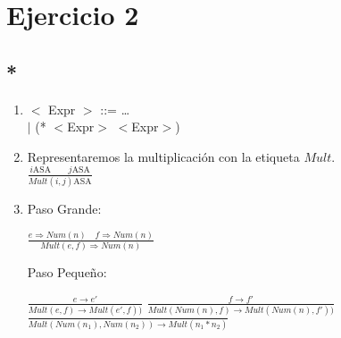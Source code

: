 \documentclass{article}
\begin{document}
\section*{Ejercicio 2}

\subsection*{*}
\begin{enumerate}[label = (\alph*)]
    \item $<$ Expr $>$ ::= \ldots \\
          $|$  (* $<$Expr$>$ $<$Expr$>$)

    \item Representaremos la multiplicación con la etiqueta $Mult$.\\
    $\frac{i\text{ASA}\qquad j\text{ASA}}{Mult(i,j)\text{ASA}}$
    
    \item Paso Grande: \begin{center}
        $\frac{e\Rightarrow Num(n)\quad f\Rightarrow Num(n)}{Mult(e,f)\Rightarrow Num(n)}$
    \end{center}

    Paso Pequeño: \begin{center}
        $\frac{e\rightarrow e'}{Mult(e,f)\rightarrow Mult(e',f))}$
        $\frac{f\rightarrow f'}{Mult(Num(n),f)\rightarrow Mult(Num(n),f'))}$
        $\frac{}{Mult(Num(n_1),Num(n_2))\rightarrow Mult(n_1*n_2)}$
    \end{center}
\end{enumerate}
\end{document}
